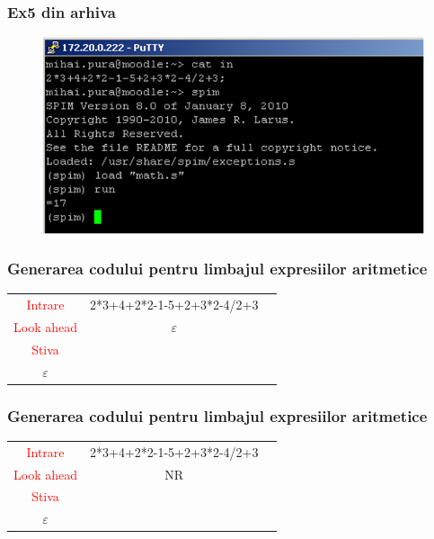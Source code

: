 \documentclass[pdf]{beamer}
\begin{document}
\begin{frame}
\frametitle{Ex5 din arhiva}
\begin{figure}
\includegraphics[width=\linewidth]{poza7.png} 
\end{figure}
\end{frame}



\begin{frame}
\frametitle{Generarea codului pentru limbajul expresiilor aritmetice}
\begin{center}
\begin{tabular}{cc|c|} \cline{1-2}
\multicolumn{1}{|c|}{\textcolor{red}{Intrare}} & {2*3+4+2*2-1-5+2+3*2-4/2+3} \\ \cline{1-2}
\multicolumn{1}{|c|}{\textcolor{red}{Look ahead}} & $\varepsilon$ \\ \cline{1-2}
\multicolumn{1}{|c|}{\textcolor{red}{Stiva}}  \\
\cline{1-1} \cline{3-3}
\multicolumn{1}{|c|}{$\varepsilon$} & & \textit{\quad}\\
\cline{1-1} \cline{3-3}
\end{tabular}
\end{center}
\end{frame}



\begin{frame}
\frametitle{Generarea codului pentru limbajul expresiilor aritmetice}
\begin{center}
\begin{tabular}{cc|c|} \cline{1-2}
\multicolumn{1}{|c|}{\textcolor{red}{Intrare}} & {2*3+4+2*2-1-5+2+3*2-4/2+3} \\ \cline{1-2}
\multicolumn{1}{|c|}{\textcolor{red}{Look ahead}} & NR \\ \cline{1-2}
\multicolumn{1}{|c|}{\textcolor{red}{Stiva}}  \\
\cline{1-1} \cline{3-3}
\multicolumn{1}{|c|}{$\varepsilon$} & & \textit{\quad}\\
\cline{1-1} \cline{3-3}
\end{tabular}
\end{center}
\end{frame}
\end{document}
